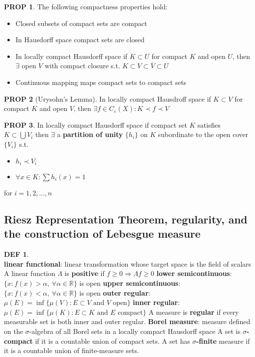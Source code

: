 \documentclass[hidelinks,10pt]{article}
\theoremstyle{definition}
\newtheorem*{defin}{DEF}
\theoremstyle{dotles}
\theoremstyle{dotless}
\newtheorem{proposition}{PROP}[section]
\theoremstyle{remark}
\begin{document}
\begin{proposition}The following compactness properties hold:
\begin{itemize}
    \item Closed subsets of compact sets are compact
    \item In Hausdorff space compact sets are closed
    \item In locally compact Hausdorff space if $K\subset U$ for compact $K$ and open $U$, then $\exists$ open $V$ with compact closure s.t. $K\subset V\subset\overline{V}\subset U$
    \item Continuous mapping maps compact sets to compact sets
\end{itemize}
\end{proposition}

\begin{proposition}[Urysohn's Lemma] In locally compact Hausdroff space if $K\subset V$ for compact $K$ and open $V$, then $\exists f\in C_c(X):K\prec f\prec V$
\end{proposition}

\begin{proposition}In locally compact Hausdorff space if compact set $K$ satisfies $K\subset\bigcup V_i$ then $\exists$ a \textbf{partition of unity} $\{h_i\}$ on $K$ subordinate to the open cover $\{V_i\}$ s.t.\begin{itemize}
    \item $h_i\prec V_i$
    \item $\forall x\in K:\sum h_i(x)=1$
\end{itemize}
for $i=1,2,...,n$
\end{proposition}

\subsection{Riesz Representation Theorem, regularity, and the construction of Lebesgue measure}

\begin{defin}~\\
\textbf{linear functional}: linear transformation whose target space is the field of scalars\newline
A linear function $\Lambda$ is \textbf{positive} if $f\geq0\Rightarrow\Lambda f\geq0$\bigbreak
\textbf{lower semicontinuous}: $\{x:f(x)>\alpha,\ \forall\alpha\in\mathbb{R}\}$ is open\newline
\textbf{upper semicontinuous}: $\{x:f(x)<\alpha,\ \forall\alpha\in\mathbb{R}\}$ is open\bigbreak
\textbf{outer regular}: $\mu(E)=\inf\{\mu(V):E\subset V\textrm{ and }V\textrm{ open}\}$\newline
\textbf{inner regular}: $\mu(E)=\inf\{\mu(K):E\subset K\textrm{ and }E\textrm{ compact}\}$\newline
A measure is \textbf{regular} if every measurable set is both inner and outer regular.\bigbreak
\textbf{Borel measure}: measure defined on the $\sigma$-algebra of all Borel sets in a locally compact Hausdorff space\bigbreak
A set is \textbf{$\sigma$-compact} if it is a countable union of compact sets. A set has \textbf{$\sigma$-finite} measure if it is a countable union of finite-measure sets.
\end{defin}
\end{document}
